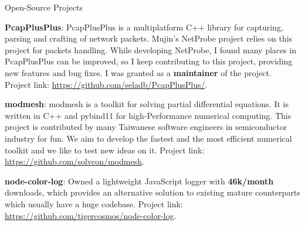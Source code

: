 
\vspace{-2mm}

\begin{cventries}

  \cventry
    {} %
    {Open-Source Projects} %
    {} %
    {} %
    {
      \vspace{-2mm}
      \begin{cvitems} %
        \item {\textbf{PcapPlusPlus}: PcapPlusPlus is a multiplatform C++ library for capturing, parsing and crafting of network packets.
          Mujin's NetProbe project relies on this project for packets handling. While developing NetProbe, I found many places in PcapPlusPlus can be improved,
          so I keep contributing to this project, providing new features and bug fixes. I was granted as a \textbf{maintainer} of the project.
          Project link: \url{https://github.com/seladb/PcapPlusPlus/}.
        }
        \item {\textbf{modmesh}: modmesh is a toolkit for solving partial differential equations. It is written in C++ and pybind11 for high-Performance
        numerical computing. This project is contributed by many Taiwanese software engineers in semiconductor industry for fun. We aim to develop the 
        fastest and the most efficient numerical toolkit and we like to test new ideas on it. Project link: \url{https://github.com/solvcon/modmesh}.
        }
        \item {\textbf{node-color-log}: Owned a lightweight JavaScript logger with \textbf{46k/month} downloads,
          which provides an alternative solution to existing mature counterparts which usually have a huge codebase. Project link: \url{https://github.com/tigercosmos/node-color-log}.
        }
      \end{cvitems}
    }
  \vspace{-2mm}

\end{cventries}
